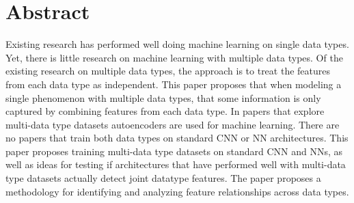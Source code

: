 \section{Abstract}


Existing research has performed well doing machine learning on single data types.
Yet, there is little research on machine learning with multiple data types. Of the
existing research on multiple data types, the approach is to treat the features from
each data type as independent. This paper proposes that when modeling a single
phenomenon with multiple data types, that some information is only captured by
combining features from each data type.  In papers that explore multi-data type datasets autoencoders are used for machine learning.  There are no papers that train both data types on standard CNN or NN architectures.   This paper proposes training multi-data type datasets on standard CNN and NNs, as well as ideas for testing if architectures that have performed well with multi-data type datasets actually detect joint datatype features.  The paper proposes a methodology for identifying and analyzing feature relationships across data types.




